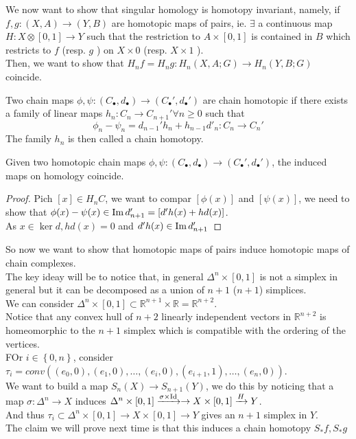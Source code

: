 \documentclass[../main.tex]{subfiles}
\begin{document}
We now want to show that singular homology is homotopy invariant, namely, if $f,g: ( X,A) \to ( Y,B) $ are homotopic maps of pairs, ie. $\exists $ a continuous map $H:X\otimes [ 0,1] \to Y$ such that the restriction to $A\times [ 0,1] $ is contained in $B$ which restricts to $f$ (resp. $g$ ) on $X\times 0$ (resp. $X\times 1$ ).\\
Then, we want to show that $H_n f = H_ng :H_n ( X,A;G) \to H_n ( Y,B;G) $ coincide.
\begin{defn}
	Two chain maps $\phi,\psi: ( C_\bullet, d_\bullet) \to ( C_{\bullet}', d_\bullet') $ are chain homotopic if there exists a family of linear maps $h_n: C_n \to C_{n+1}'\forall n \geq 0 $ such that 
	\[ 
	\phi_n- \psi_n =d_{n-1} 'h_n + h_{n-1}  d'_n : C_n \to C_n'
	\]
	The family $h_n$ is then called a chain homotopy.
	
\end{defn}
\begin{propo}
Given two homotopic chain maps $\phi,\psi: ( C_\bullet,d_\bullet) \to ( C_\bullet', d_\bullet')$, the induced maps on homology coincide.
\end{propo}
\begin{proof}
	Pich $[x] \in H_n C$, we want to compar $[\phi( x) ] $ and $ [ \psi( x) ] $, we need to show that $\phi( x) - \psi( x) \in \operatorname{Im} d_{n+1}'= [ d'h( x) + hd( x) ] $.\\
	As $x\in \ker d, hd( x) =0 $ and $d'h( x) \in \operatorname{Im} d_{n+1}'$ 
\end{proof}
So now we want to show that homotopic maps of pairs induce homotopic maps of chain complexes.\\
The key ideay will be to notice that, in general $\Delta^{n}\times [ 0,1] $ is not a simplex in general but it can be decomposed as a union of $n+1$ ($n+1$) simplices.\\

We can consider $\Delta^{n}\times [ 0,1] \subset \mathbb{R}^{n+1}\times \mathbb{R}= \mathbb{R}^{n+2}$.\\
Notice that any convex hull of $n+2$ linearly independent vectors in $ \mathbb{R}^{n+2}$ is homeomorphic to the $n+1$ simplex which is compatible with the ordering of the vertices.\\
FOr $i \in \left\{ 0,n \right\} $, consider $\tau_i = conv( ( e_0,0) , ( e_1,0) ,\ldots, ( e_i, 0) , ( e_{i+1} ,1) ,\ldots, ( e_n,0) ) $.\\
We want to build a map $S_n ( X) \to S_{n+1} ( Y) $, we do this by noticing that a map $\sigma: \Delta^{n}\to X$ induces $\Delta^{n}\times [ 0,1] \xrightarrow{\sigma\times \operatorname{Id}} \to X \times [ 0,1] \xrightarrow{H} Y$.\\
And thus $\tau_i \subset \Delta^{n}\times [ 0,1] \to  X\times [ 0,1] \to Y$ gives an $n+1$ simplex in $Y$.\\
The claim we will prove next time is that this induces a chain homotopy $S_\ast f, S_\ast g$ 
\end{document}
